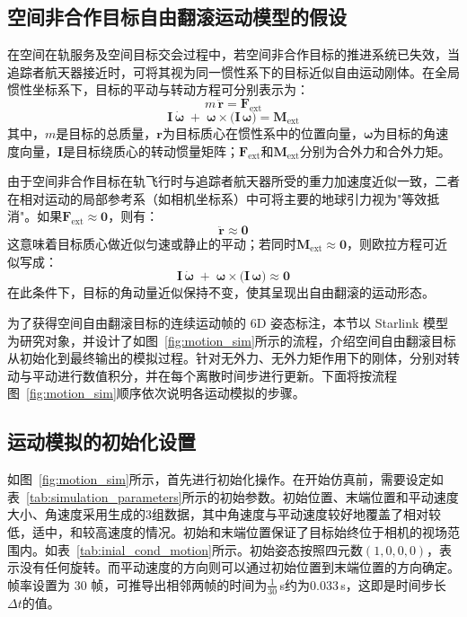 \subsection{空间非合作目标自由翻滚运动模型的假设}
在空间在轨服务及空间目标交会过程中，若空间非合作目标的推进系统已失效，当追踪者航天器接近时，可将其视为同一惯性系下的目标近似自由运动刚体。在全局惯性坐标系下，目标的平动与转动方程可分别表示为：
\begin{equation}
	m\,\ddot{\mathbf{r}} = \mathbf{F}_\mathrm{ext}
\end{equation}
\begin{equation}
	\label{eq:eluar_eq}
	\mathbf{I}\,\dot{\boldsymbol{\omega}}
	\;+\;
	\boldsymbol{\omega} \times \bigl(\mathbf{I}\,\boldsymbol{\omega}\bigr)
	= \mathbf{M}_\mathrm{ext}
\end{equation}
其中，$m$是目标的总质量，$\mathbf{r}$为目标质心在惯性系中的位置向量，$\boldsymbol{\omega}$为目标的角速度向量，$\mathbf{I}$是目标绕质心的转动惯量矩阵；$\mathbf{F}_\mathrm{ext}$和$\mathbf{M}_\mathrm{ext}$分别为合外力和合外力矩。

由于空间非合作目标在轨飞行时与追踪者航天器所受的重力加速度近似一致，二者在相对运动的局部参考系（如相机坐标系）中可将主要的地球引力视为"等效抵消"。如果$\mathbf{F}_\mathrm{ext} \approx \mathbf{0}$，则有：
\begin{equation}
	\ddot{\mathbf{r}} \approx \mathbf{0}
\end{equation}
这意味着目标质心做近似匀速或静止的平动；若同时$\mathbf{M}_\mathrm{ext} \approx \mathbf{0}$，则欧拉方程可近似写成：
\begin{equation}
	\mathbf{I}\,\dot{\boldsymbol{\omega}}
	\;+\;
	\boldsymbol{\omega} \times \bigl(\mathbf{I}\,\boldsymbol{\omega}\bigr)
	\approx \mathbf{0}
\end{equation}
在此条件下，目标的角动量近似保持不变，使其呈现出自由翻滚的运动形态。

为了获得空间自由翻滚目标的连续运动帧的 6D 姿态标注，本节以 Starlink 模型为研究对象，并设计了如图~\ref{fig:motion_sim}所示的流程，介绍空间自由翻滚目标从初始化到最终输出的模拟过程。针对无外力、无外力矩作用下的刚体，分别对转动与平动进行数值积分，并在每个离散时间步进行更新。下面将按流程图~\ref{fig:motion_sim}顺序依次说明各运动模拟的步骤。

\subsection{运动模拟的初始化设置}
\label{subsection:motion_initial_settings}
如图~\ref{fig:motion_sim}所示，首先进行初始化操作。在开始仿真前，需要设定如表~\ref{tab:simulation_parameters}所示的初始参数。初始位置、末端位置和平动速度大小、角速度采用生成的3组数据，其中角速度与平动速度较好地覆盖了相对较低，适中，和较高速度的情况。初始和末端位置保证了目标始终位于相机的视场范围内。如表~\ref{tab:inial_cond_motion}所示。初始姿态按照四元数$(1,0,0,0)$，表示没有任何旋转。而平动速度的方向则可以通过初始位置到末端位置的方向确定。帧率设置为 30 帧，可推导出相邻两帧的时间为$\frac{1}{30}$\,s约为$0.033$\,s，这即是时间步长$\Delta t$的值。

